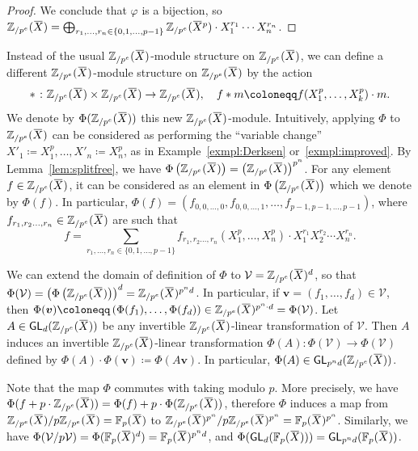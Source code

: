 \documentclass[letterpaper, 11pt, thm-restate]{article}
\numberwithin{equation}{section}
\newcommand{\F}{\mathbb{F}}
\newcommand{\Zpe}{\mathbb{Z}_{/p^e}}
\newcommand{\GL}{\mathsf{GL}}
\newcommand{\mV}{\mathcal{V}}
\newcommand{\bv}{\boldsymbol{v}}
\newcommand{\oX}{\mkern 1.5mu\overline{\mkern-1.5mu X \mkern-1.5mu}\mkern 1.5mu}
\theoremstyle{definition}
\theoremstyle{definition}
\theoremstyle{definition}
\begin{document}
\begin{proof}
    We conclude that $\varphi$ is a bijection, so $\Zpe(\oX) = \bigoplus_{r_1, \ldots, r_n \in \{0, 1, \ldots, p-1\}} \Zpe(\oX^p) \cdot X_1^{r_1} \cdots X_n^{r_n}$.
\end{proof}

Instead of the usual $\Zpe(\oX)$-module structure on $\Zpe(\oX)$, we can define a different $\Zpe(\oX)$-module structure on $\Zpe(\oX)$ by the action
\[
* \; \colon \Zpe(\oX) \times \Zpe(\oX) \rightarrow \Zpe(\oX), \quad f * m \coloneqq f(X_1^p, \ldots, X_k^p) \cdot m.
\]
We denote by $\Phi(\Zpe(\oX))$ this new $\Zpe(\oX)$-module. 
Intuitively, applying $\Phi$ to $\Zpe(\oX)$ can be considered as performing the ``variable change'' $X'_1 \coloneqq X_1^p, \ldots, X'_n \coloneqq X_n^p$, as in Example~\ref{exmpl:Derksen} or~\ref{exmpl:improved}.
By Lemma~\ref{lem:splitfree}, we have $\Phi\left(\Zpe(\oX)\right) = \left(\Zpe(\oX)\right)^{p^n}$.
For any element $f \in \Zpe(\oX)$, it can be considered as an element in $\Phi\left(\Zpe(\oX)\right)$ which we denote by $\Phi(f)$.
In particular, $\Phi(f) = (f_{0, 0, \ldots, 0}, f_{0, 0, \ldots, 1}, \ldots, f_{p-1, p-1, \ldots, p-1})$, where $f_{r_1, r_2 \ldots, r_n} \in \Zpe(\oX)$ are such that
\[
f = \sum_{r_1, \ldots, r_n \in \{0, 1, \ldots, p-1\}} f_{r_1, r_2 \ldots, r_n}(X_1^p, \ldots, X_n^p) \cdot X_1^{r_1} X_2^{r_2} \cdots X_n^{r_n}.
\]

We can extend the domain of definition of $\Phi$ to $\mV = \Zpe(\oX)^{d}$, so that $\Phi(\mV) = \left(\Phi\left(\Zpe(\oX)\right)\right)^d = \Zpe(\oX)^{p^n d}$.
In particular, if $\bv = (f_1, \ldots, f_d) \in \mV$, then $\Phi(\bv) \coloneqq \left(\Phi(f_1), \ldots, \Phi(f_d)\right) \in \Zpe(\oX)^{p^n \cdot d} = \Phi(\mV)$.
Let $A \in \GL_d(\Zpe(\oX))$ be any invertible $\Zpe(\oX)$-linear transformation of $\mV$. 
Then $A$ induces an invertible $\Zpe(\oX)$-linear transformation $\Phi(A) \colon \Phi(\mV) \rightarrow \Phi(\mV)$ defined by $\Phi(A) \cdot \Phi(\bv) \coloneqq \Phi(A\bv)$.
In particular, $\Phi(A) \in \GL_{p^n d}(\Zpe(\oX))$.

Note that the map $\Phi$ commutes with taking modulo $p$. More precisely, we have $\Phi(f + p \cdot \Zpe(\oX)) = \Phi(f) + p \cdot\Phi(\Zpe(\oX))$, therefore $\Phi$ induces a map from $\Zpe(\oX)/p\Zpe(\oX) = \F_p(\oX)$ to $\Zpe(\oX)^{p^n}/p\Zpe(\oX)^{p^n} = \F_p(\oX)^{p^n}$.
Similarly, we have $\Phi(\mV/p\mV) = \Phi(\F_p(\oX)^d) = \F_p(\oX)^{p^n d}$, and $\Phi(\GL_d(\F_p(\oX))) = \GL_{p^n d}(\F_p(\oX))$.
\end{document}

